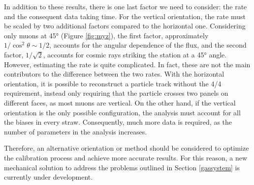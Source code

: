 In addition to these results, there is one last factor we need to consider: the rate and the consequent data taking time.
For the vertical orientation, the rate must be scaled by two additional factors compared to the horizontal one.
Considering only muons at 45° (Figure \ref{fig:myz}), the first factor, 
approximately $1/\cos^2\theta \sim 1/2$, accounts for the angular dependence of the flux,
and the second factor, $1/\sqrt{2}$, accounts for cosmic rays striking the station at a 45° angle.
However, estimating the rate is quite complicated. In fact, these are not the main contributors to the difference between the two rates.
With the horizontal orientation, it is possible to reconstruct a particle track without the 4/4 requirement,
instead only requiring that the particle crosses two panels on different faces, as most muons are vertical.
On the other hand, if the vertical orientation is the only possible configuration,
the analysis must account for all the biases in every straw.
Consequently, much more data is required, as the number of parameters in the analysis increases.


Therefore, an alternative orientation or method should be considered to optimize the calibration process and achieve more accurate results.
For this reason, a new mechanical solution to address the problems outlined in Section \ref{gassystem} is currently under development.

